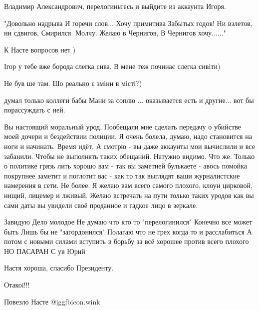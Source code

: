 \begin{itemize}
Владимир Александрович, перелогиньтесь и выйдите из аккаунта Игоря.


\obeycr
"Довольно надрыва
И горечи слов...
Хочу примитива
Забытых годов!
Ни взлетов, ни сдвигов,
Смирился. Молчу.
Желаю в Чернигов,
В Чернигов хочу......"
\restorecr

К Насте вопросов нет )

Ігор у тебе вже борода слегка сива. В мене теж починає слегка сивіти)

Не був ше там. Шо реально є зміни в місті?)

думал только коллеги бабы Мани за соплю ... оказывается есть и другие... вот бы порассуждать с ней.


Вы настоящий моральный урод. Пообещали мне сделать передачу о убийстве моей
дочери и бездействии полиции. Я очень болела, думаю, надо становится на ноги и
начинать. Время идёт. А смотрю - вы даже аккаунты мои вычислили и все забанили.
Чтобы не выполнять таких обещаний. Натужно видимо. Что же. Только о политике
грязь лить хорошо вам - так вы заметней булькаете - авось помойка покрупнее
заметит и поглотит вас - как то так выглядят ваши журналистские намерения в
сети. Не более. Я желаю вам всего самого плохого, клоун цирковой, нищий,
лицемер и лживый. Желаю встречать на пути только таких уродов как вы сами даты
вы увидели своё проданное и гадкое лицо в зеркале.


Завидую Дело молодое Не думаю что кто то "перелогинился" Конечно все может быть
Лишь бы не "загордонился" Полагаю что не грех когда то и расслабиться А потом с
новыми силами вступить в борьбу за всё хорошее против всего плохого НО ПАСАРАН
С ув Юрий


Настя хороша, спасибо Президенту.

Отакоi!!!

Повезло Насте  @igg{fbicon.wink} 


\end{itemize} %
